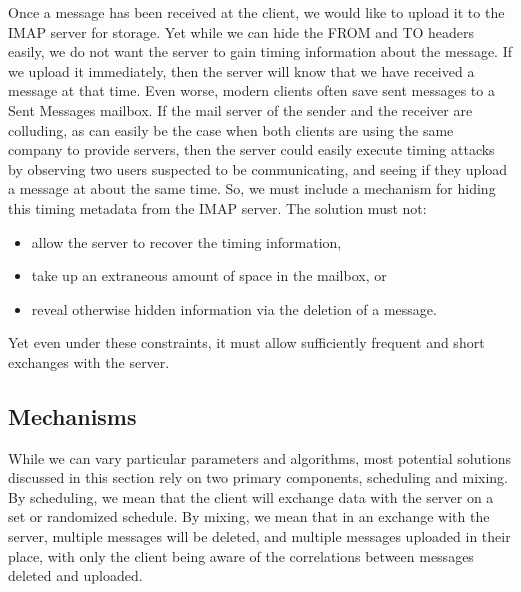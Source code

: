 \documentclass[pageno]{jpaper}
\newcommand{\project}{IMAPSec }
\begin{document}
Once a message has been received at the client, we would like to upload it to the IMAP server for storage. Yet while we can hide the FROM and TO headers easily, we do not want the server to gain timing information about the message. If we upload it immediately, then the server will know that we have received a message at that time. Even worse, modern clients often save sent messages to a Sent Messages mailbox. If the mail server of the sender and the receiver are colluding, as can easily be the case when both clients are using the same company to provide servers, then the server could easily execute timing attacks by observing two users suspected to be communicating, and seeing if they upload a message at about the same time. So, we must include a mechanism for hiding this timing metadata from the IMAP server. The solution must not:

\begin{itemize}
  \item allow the server to recover the timing information,
  \item take up an extraneous amount of space in the mailbox, or
  \item reveal otherwise hidden information via the deletion of a message.
\end{itemize}

Yet even under these constraints, it must allow sufficiently frequent and short exchanges with the server.


\subsection{Mechanisms}

While we can vary particular parameters and algorithms, most potential solutions discussed in this section rely on two primary components, scheduling and mixing. By scheduling, we mean that the client will exchange data with the server on a set or randomized schedule. By mixing, we mean that in an exchange with the server, multiple messages will be deleted, and multiple messages uploaded in their place, with only the client being aware of the correlations between messages deleted and uploaded.

\medskip

\begin{center}
\end{center}
\end{document}
